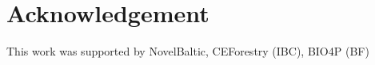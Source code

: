 \documentclass[a4paper,fleqn]{cas-dc}
\begin{document}
\section*{Acknowledgement} 
This work was supported by NovelBaltic, CEForestry (IBC), BIO4P (BF)

\newpage
%



%

\newpage
\end{document}
